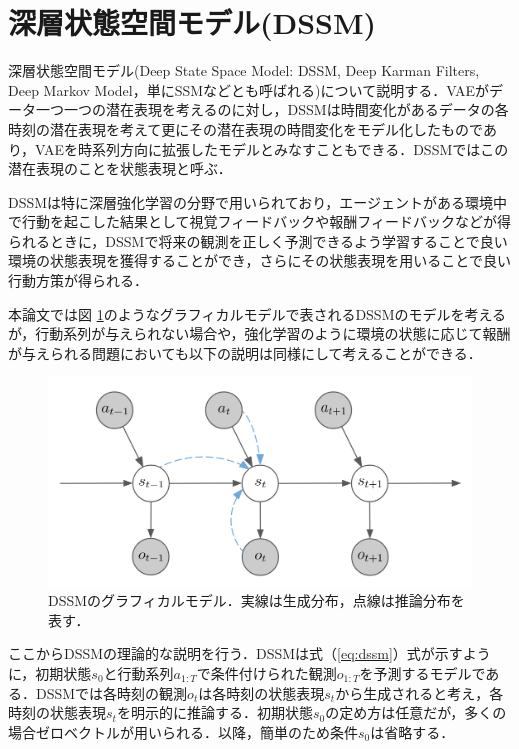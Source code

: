 \clearpage
\section{深層状態空間モデル(DSSM)}
\label{section:dssm}

深層状態空間モデル(Deep State Space Model: DSSM, Deep Karman Filters, Deep Markov Model，単にSSMなどとも呼ばれる)\cite{krishnan2015deep}\cite{krishnan2017structured}について説明する．VAEがデータ一つ一つの潜在表現を考えるのに対し，DSSMは時間変化があるデータの各時刻の潜在表現を考えて更にその潜在表現の時間変化をモデル化したものであり，VAEを時系列方向に拡張したモデルとみなすこともできる．DSSMではこの潜在表現のことを状態表現と呼ぶ．

DSSMは特に深層強化学習の分野で用いられており，エージェントがある環境中で行動を起こした結果として視覚フィードバックや報酬フィードバックなどが得られるときに，DSSMで将来の観測を正しく予測できるよう学習することで良い環境の状態表現を獲得することができ，さらにその状態表現を用いることで良い行動方策が得られる\cite{hafner2019dream}．

\vspace{\baselineskip}
本論文では図 \ref{fig:ssm}のようなグラフィカルモデルで表されるDSSMのモデルを考えるが，行動系列が与えられない場合や，強化学習のように環境の状態に応じて報酬が与えられる問題においても以下の説明は同様にして考えることができる．

\begin{figure}[bp]
  \begin{center}
    \includegraphics[width=0.7\linewidth]{./figures/dssm.png}
    \caption[DSSMのグラフィカルモデル]{DSSMのグラフィカルモデル．実線は生成分布，点線は推論分布を表す．}
    \label{fig:ssm}
  \end{center}
\end{figure}

\vspace{\baselineskip}
ここからDSSMの理論的な説明を行う．DSSMは式（\ref{eq:dssm}）式が示すように，初期状態$s_0$と行動系列$a_{1:T}$で条件付けられた観測$o_{1:T}$を予測するモデルである．DSSMでは各時刻の観測$o_t$は各時刻の状態表現$s_t$から生成されると考え，各時刻の状態表現$s_t$を明示的に推論する．初期状態$s_0$の定め方は任意だが，多くの場合ゼロベクトルが用いられる．以降，簡単のため条件$s_0$は省略する．

